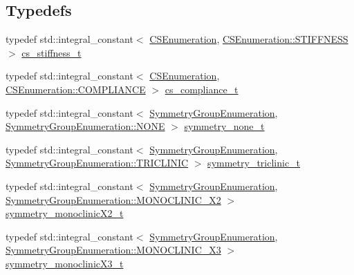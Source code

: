 \subsection*{Typedefs}
\begin{DoxyCompactItemize}
\item 
typedef std\+::integral\+\_\+constant$<$ \mbox{\hyperlink{namespacempc_1_1core_ad3e8e7d43bfc9202d954d999f7d5c991}{C\+S\+Enumeration}}, \mbox{\hyperlink{namespacempc_1_1core_ad3e8e7d43bfc9202d954d999f7d5c991aa231c1d74fe18f9e82224588887d1971}{C\+S\+Enumeration\+::\+S\+T\+I\+F\+F\+N\+E\+SS}} $>$ \mbox{\hyperlink{namespacempc_1_1core_a120bef8b8e9eb17c3455661c0f51950a}{cs\+\_\+stiffness\+\_\+t}}
\item 
typedef std\+::integral\+\_\+constant$<$ \mbox{\hyperlink{namespacempc_1_1core_ad3e8e7d43bfc9202d954d999f7d5c991}{C\+S\+Enumeration}}, \mbox{\hyperlink{namespacempc_1_1core_ad3e8e7d43bfc9202d954d999f7d5c991a185bd2ffef1962ade3c0889c62cee500}{C\+S\+Enumeration\+::\+C\+O\+M\+P\+L\+I\+A\+N\+CE}} $>$ \mbox{\hyperlink{namespacempc_1_1core_a33e8b8a9ae039df62c62872553ca7161}{cs\+\_\+compliance\+\_\+t}}
\item 
typedef std\+::integral\+\_\+constant$<$ \mbox{\hyperlink{namespacempc_1_1core_a9d979684062547055a0ef5c13077bad8}{Symmetry\+Group\+Enumeration}}, \mbox{\hyperlink{namespacempc_1_1core_a9d979684062547055a0ef5c13077bad8ab50339a10e1de285ac99d4c3990b8693}{Symmetry\+Group\+Enumeration\+::\+N\+O\+NE}} $>$ \mbox{\hyperlink{namespacempc_1_1core_a2b8454b3fb237992c1e1d43897efa248}{symmetry\+\_\+none\+\_\+t}}
\item 
typedef std\+::integral\+\_\+constant$<$ \mbox{\hyperlink{namespacempc_1_1core_a9d979684062547055a0ef5c13077bad8}{Symmetry\+Group\+Enumeration}}, \mbox{\hyperlink{namespacempc_1_1core_a9d979684062547055a0ef5c13077bad8a049b6e2743d57033eacaea302ca6710a}{Symmetry\+Group\+Enumeration\+::\+T\+R\+I\+C\+L\+I\+N\+IC}} $>$ \mbox{\hyperlink{namespacempc_1_1core_aac81e6abdf397b85db386498023abce6}{symmetry\+\_\+triclinic\+\_\+t}}
\item 
typedef std\+::integral\+\_\+constant$<$ \mbox{\hyperlink{namespacempc_1_1core_a9d979684062547055a0ef5c13077bad8}{Symmetry\+Group\+Enumeration}}, \mbox{\hyperlink{namespacempc_1_1core_a9d979684062547055a0ef5c13077bad8a7eb6e11f17e97fbe9fc371a72a989b96}{Symmetry\+Group\+Enumeration\+::\+M\+O\+N\+O\+C\+L\+I\+N\+I\+C\+\_\+\+X2}} $>$ \mbox{\hyperlink{namespacempc_1_1core_a306d5d3ef71068ebd7f68b2fc7612f70}{symmetry\+\_\+monoclinic\+X2\+\_\+t}}
\item 
typedef std\+::integral\+\_\+constant$<$ \mbox{\hyperlink{namespacempc_1_1core_a9d979684062547055a0ef5c13077bad8}{Symmetry\+Group\+Enumeration}}, \mbox{\hyperlink{namespacempc_1_1core_a9d979684062547055a0ef5c13077bad8ab31f5171fdded777eb3112da45967b57}{Symmetry\+Group\+Enumeration\+::\+M\+O\+N\+O\+C\+L\+I\+N\+I\+C\+\_\+\+X3}} $>$ \mbox{\hyperlink{namespacempc_1_1core_a5d8f530135aa7d7848a2413cc8723662}{symmetry\+\_\+monoclinic\+X3\+\_\+t}}

\end{DoxyCompactItemize}
